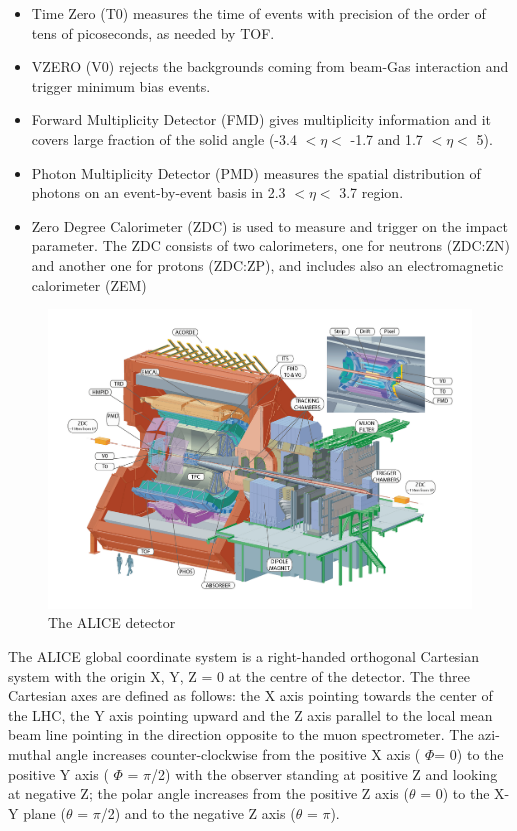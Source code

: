 \begin{itemize}
\item Time Zero (T0) measures the time of events with precision of the order of tens of picoseconds, as needed by TOF.
\item VZERO (V0) rejects the backgrounds coming from beam-Gas interaction and trigger minimum bias events.
\item Forward Multiplicity Detector (FMD) gives multiplicity information and it covers large fraction of the solid angle (-3.4 $< \eta <$ -1.7 and 1.7 $< \eta <$ 5).
\item Photon Multiplicity Detector (PMD) measures the spatial distribution of photons on an event-by-event basis in 2.3 $< \eta <$ 3.7 region.
\item Zero Degree Calorimeter (ZDC) is used to measure and trigger on the impact parameter. The ZDC consists of two calorimeters, one for neutrons (ZDC:ZN) and another one for protons (ZDC:ZP), and includes also an electromagnetic calorimeter (ZEM)
\end{itemize}

\begin{figure}[htbp]
\begin{center}
\includegraphics[width=14.cm]{./Version1/FigChapter4/FigureALICE}
\caption{ The ALICE detector}
\label{fig:alicedetector}
\end{center}
\end{figure}


The ALICE global coordinate system \cite{cite:ALICEcoord} is a right-handed orthogonal Cartesian system with the origin X, Y, Z = 0 at the centre of the detector. The three Cartesian axes are defined as follows: the X axis pointing towards the center of the LHC, the Y axis pointing upward and the Z axis parallel to the local mean beam line pointing in the direction opposite to the muon spectrometer. The azi- muthal angle increases counter-clockwise from the positive X axis ( $\Phi$= 0) to the positive Y axis (  $\Phi$ = $\pi$/2) with the observer standing at positive Z and looking at negative Z; the polar angle increases from the positive Z axis ($\theta$ = 0) to the X-Y plane ($\theta$ = $\pi$/2) and to the negative Z axis ($\theta$ = $\pi$).

